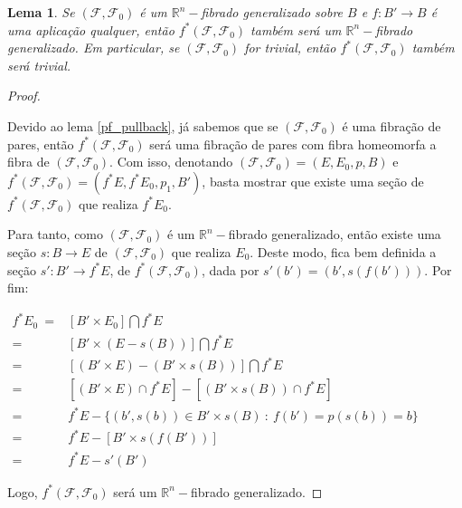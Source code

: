 \documentclass[12pt,oneside]{book} %
\newtheorem{lem}    {\hspace{0.5cm}Lema}[chapter]
\newcommand{\R}{\mathbb{R}}
\begin{document}
\begin{lem}\label{fht_pullback}
	Se $(\mathcal{F},\mathcal{F}_{0})$ é um $\R^{n}-$fibrado generalizado sobre $B$ e $f:B'\to B$ é uma aplicação qualquer, então $f^{*}(\mathcal{F},\mathcal{F}_{0})$ também será um $\R^{n}-$fibrado generalizado. Em particular, se $(\mathcal{F},\mathcal{F}_{0})$ for trivial, então $f^{*}(\mathcal{F},\mathcal{F}_{0})$ também será trivial.
\end{lem}
\begin{proof}
	
	\
	
	\par Devido ao lema \ref{pf_pullback}, já sabemos que se $(\mathcal{F},\mathcal{F}_{0})$ é uma fibração de pares, então $f^{*}(\mathcal{F},\mathcal{F}_{0})$ será uma fibração de pares com fibra homeomorfa a fibra de $(\mathcal{F},\mathcal{F}_{0})$. Com isso, denotando $(\mathcal{F},\mathcal{F}_{0})=(E,E_{0},p,B)$ e $f^{*}(\mathcal{F},\mathcal{F}_{0})=(f^{*}E,f^{*}E_{0},p_{1},B')$, basta mostrar que existe uma seção de $f^{*}(\mathcal{F},\mathcal{F}_{0})$ que realiza $f^{*}E_{0}$.
	
	\par Para tanto, como $(\mathcal{F},\mathcal{F}_{0})$ é um $\R^{n}-$fibrado generalizado, então existe uma seção $s:B\to E$ de $(\mathcal{F},\mathcal{F}_{0})$ que realiza $E_{0}$. Deste modo, fica bem definida a seção $s':B'\to f^{*}E$, de $f^{*}(\mathcal{F},\mathcal{F}_{0})$, dada por $s'(b')=(b',s(f(b')))$. Por fim: \newline
	
	$\begin{array}{rl}
		f^{*}E_{0} \ = & [B'\times E_{0}]\bigcap f^{*}E \\
		= & [B'\times (E-s(B))]\bigcap f^{*}E \\
		= & [(B'\times E)-(B'\times s(B))]\bigcap f^{*}E \\
		= & [(B'\times E)\cap f^{*}E]-[(B'\times s(B))\cap f^{*}E] \\
		= & f^{*}E - \{ (b',s(b))\in B'\times s(B) \ : \ f(b')=p(s(b))=b \} \\
		= & f^{*}E - [B'\times s(f(B'))] \\
		= & f^{*}E - s'(B')
	\end{array}$ \newline
	
	\par Logo, $f^{*}(\mathcal{F},\mathcal{F}_{0})$ será um $\R^{n}-$fibrado generalizado.
	

\end{proof}
\end{document}
